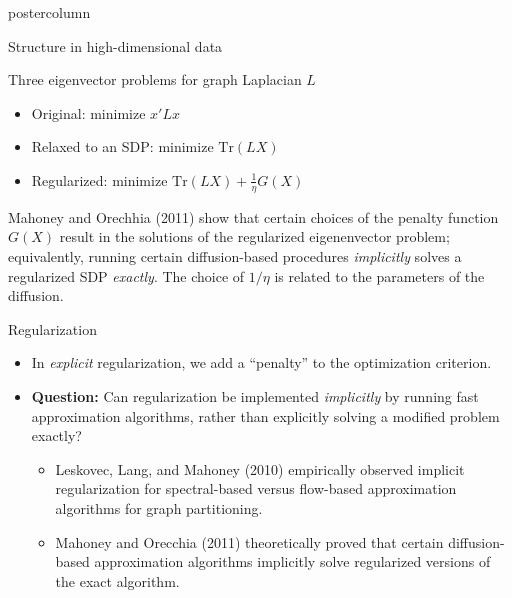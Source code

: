 \documentclass[final,hyperref={pdfpagelabels=false}]{beamer}
\begin{document}
\begin{frame}
\begin{columns}
\begin{column}{.49\textwidth}
\begin{beamercolorbox}[center,wd=\textwidth]{postercolumn}
\begin{minipage}[T]{.95\textwidth}
{\begin{block}{Structure in high-dimensional data}
            \end{block}

            \vfill

            \begin{block}{Three eigenvector problems for graph Laplacian $L$}
              \begin{itemize}
              \item Original: minimize $x' L x$
              \item Relaxed to an SDP: minimize $\mathrm{Tr}(L X)$
              \item Regularized: minimize $\mathrm{Tr}(L X) + \tfrac{1}{\eta} G(X)$
              \end{itemize}

	      \vspace{1em}
	      Mahoney and Orechhia (2011) show that certain choices of the penalty
	      function $G(X)$ result in the solutions of the regularized
	      eigenenvector problem; equivalently, running certain
	      diffusion-based procedures \emph{implicitly} solves a
	      regularized SDP \emph{exactly}.  The choice of $1/\eta$ is
	      related to the parameters of the diffusion.
            \end{block}

	    \vfill

            \begin{block}{Regularization}
	      \begin{itemize}
	        \item In \emph{explicit} regularization, we add a ``penalty'' to the
		optimization criterion.

		\vspace{2em}
		\item \textbf{Question:} Can regularization be implemented
		\emph{implicitly} by running fast approximation algorithms, rather
		than explicitly solving a modified problem exactly?
		\begin{itemize}
		\item Leskovec, Lang, and Mahoney (2010) empirically observed
		implicit regularization for spectral-based versus flow-based
		approximation algorithms for graph partitioning.

		\item Mahoney and Orecchia (2011) theoretically proved that
		certain diffusion-based approximation algorithms implicitly solve
		regularized versions of the exact algorithm.
		\end{itemize}


\end{itemize}
\end{block}}
\end{minipage}
\end{beamercolorbox}
\end{column}
\end{columns}
\end{frame}
\end{document}
